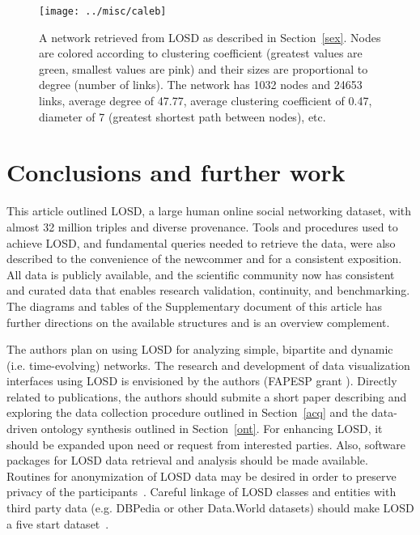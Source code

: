 \documentclass[data,datadescriptor,submit,moreauthors,pdftex]{Definitions/mdpi}
\begin{document}
\begin{figure}[H]
    \centering
    \texttt{[image: ../misc/caleb]}
    \caption{
      A network retrieved from LOSD as described in Section~\ref{sex}.
  Nodes are colored according to clustering coefficient (greatest values are green, smallest values are pink) and their sizes are proportional to degree (number of links). The network has 1032 nodes and 24653 links, average degree of 47.77, average clustering coefficient of 0.47, diameter of 7 (greatest shortest path between nodes), etc.
    }\label{caleb}
\end{figure}

\section{Conclusions and further work}
\label{conclusions}
This article outlined LOSD, a large human online social networking dataset, with almost 32 million triples and diverse provenance.
Tools and procedures used to achieve LOSD, and fundamental queries needed to retrieve the data, were also described to the convenience of the newcommer
and for a consistent exposition.
All data is publicly available, and the scientific community now has consistent and curated data
that enables research validation, continuity, and benchmarking.
The diagrams and tables of the Supplementary document of this article
has further directions on the available structures and is an overview complement.

The authors plan on using LOSD for analyzing simple, bipartite
and dynamic (i.e. time-evolving) networks.
The research and development of data visualization interfaces using LOSD
is envisioned by the authors (FAPESP grant ).
Directly related to publications, the authors should submite a short paper
describing and exploring the data collection procedure outlined in Section~\ref{acq} and the data-driven ontology synthesis outlined in Section~\ref{ont}.
For enhancing LOSD, it should be expanded upon need or request from interested parties.
Also, software packages for LOSD data retrieval and analysis should be made available.
Routines for anonymization of LOSD data may be desired in order to preserve privacy of the participants~\cite{ieee}.
Careful linkage of LOSD classes and entities with third party data (e.g. DBPedia or other Data.World datasets) should make LOSD a five start dataset~\cite{5star}.


\end{document}
